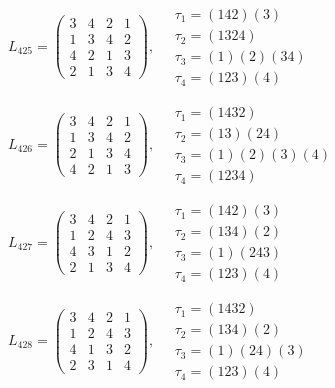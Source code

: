 $L_{425} = \begin{pmatrix} 3 & 4 & 2 & 1 \\ 1 & 3 & 4 & 2 \\ 4 & 2 & 1 & 3 \\ 2 & 1 & 3 & 4 \end{pmatrix}, \quad \begin{matrix} \tau_{1} = (1 4 2)(3) \\ \tau_{2} = (1 3 2 4) \\ \tau_{3} = (1)(2)(3 4) \\ \tau_{4} = (1 2 3)(4) \end{matrix}$

$L_{426} = \begin{pmatrix} 3 & 4 & 2 & 1 \\ 1 & 3 & 4 & 2 \\ 2 & 1 & 3 & 4 \\ 4 & 2 & 1 & 3 \end{pmatrix}, \quad \begin{matrix} \tau_{1} = (1 4 3 2) \\ \tau_{2} = (1 3)(2 4) \\ \tau_{3} = (1)(2)(3)(4) \\ \tau_{4} = (1 2 3 4) \end{matrix}$

$L_{427} = \begin{pmatrix} 3 & 4 & 2 & 1 \\ 1 & 2 & 4 & 3 \\ 4 & 3 & 1 & 2 \\ 2 & 1 & 3 & 4 \end{pmatrix}, \quad \begin{matrix} \tau_{1} = (1 4 2)(3) \\ \tau_{2} = (1 3 4)(2) \\ \tau_{3} = (1)(2 4 3) \\ \tau_{4} = (1 2 3)(4) \end{matrix}$

$L_{428} = \begin{pmatrix} 3 & 4 & 2 & 1 \\ 1 & 2 & 4 & 3 \\ 4 & 1 & 3 & 2 \\ 2 & 3 & 1 & 4 \end{pmatrix}, \quad \begin{matrix} \tau_{1} = (1 4 3 2) \\ \tau_{2} = (1 3 4)(2) \\ \tau_{3} = (1)(2 4)(3) \\ \tau_{4} = (1 2 3)(4) \end{matrix}$


